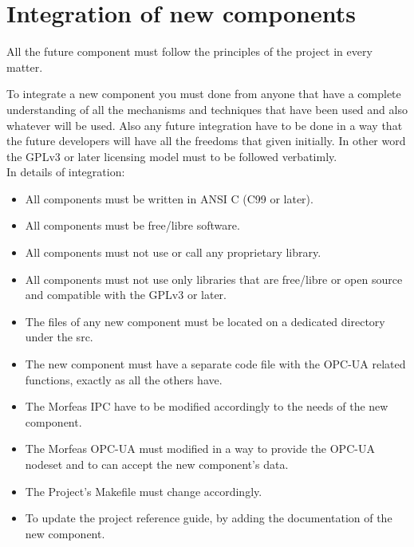 \section{Integration of new components}
All the future component must follow the principles of the project in every matter.

To integrate a new component you must done from anyone that have a complete understanding of all the mechanisms and techniques that have been used and also whatever will be used. 
Also any future integration have to be done in a way that the future developers will have all the freedoms that given initially. 
In other word the GPLv3 or later licensing model must to be followed verbatimly.\\

In details of integration:
\begin{itemize}
	\item All components must be written in ANSI C (C99 or later).
	\item All components must be free/libre software.
	\item All components must not use or call any proprietary library.
	\item All components must not use only libraries that are free/libre or open source and compatible with the GPLv3 or later.
	\item The files of any new component must be located on a dedicated directory under the src.  
	\item The new component must have a separate code file with the OPC-UA related functions, exactly as all the others have. 
	\item The Morfeas IPC have to be modified accordingly to the needs of the new component.
	\item The Morfeas OPC-UA must modified in a way to provide the OPC-UA nodeset and to can accept the new component's data.
	\item The Project's Makefile must change accordingly.
	\item To update the project reference guide, by adding the documentation of the new component.
\end{itemize}